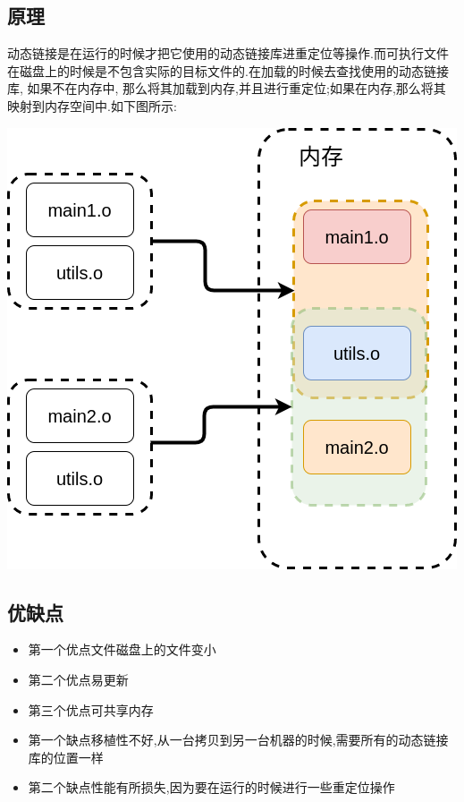 \documentclass{article}
\begin{document}
\subsection{原理} 
动态链接是在运行的时候才把它使用的动态链接库进重定位等操作.而可执行文件在磁盘上的时候是不包含实际的目标文件的.在加载的时候去查找使用的动态链接库, 如果不在内存中, 那么将其加载到内存,并且进行重定位;如果在内存,那么将其映射到内存空间中.如下图所示: \par
\includegraphics[scale=0.4]{pic3.png} \par
\subsection{优缺点} 
\begin{itemize}
	\item 第一个优点文件磁盘上的文件变小
	\item 第二个优点易更新
	\item 第三个优点可共享内存
	\item 第一个缺点移植性不好,从一台拷贝到另一台机器的时候,需要所有的动态链接库的位置一样
	\item 第二个缺点性能有所损失,因为要在运行的时候进行一些重定位操作
\end{itemize}
\end{document}
